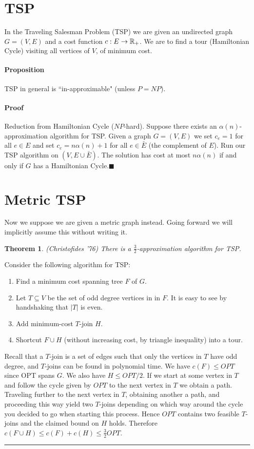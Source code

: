 \documentclass[letterpaper,12pt,oneside,onecolumn]{article}
\newenvironment{proof}{{\bf Proof:  }}{\hfill\rule{2mm}{2mm}}
\newtheorem{theorem}[fact]{Theorem}
\begin{document}
\section{TSP}
\paragraph{}
In the Traveling Salesman Problem (TSP) we are given an undirected graph $G = (V,E)$ and a cost function $c: E \rightarrow \mathbb{R}_+$. We are to find a tour (Hamiltonian Cycle) visiting all vertices of $V$, of minimum cost.
\paragraph{Proposition}
TSP in general is ``in-approximable" (unless $P=NP$).
\paragraph{Proof}
Reduction from Hamiltonian Cycle ($NP$-hard). Suppose there exists an $\alpha(n)$-approximation algorithm for TSP. Given a graph $G=(V,E)$ we set $c_e = 1$ for all $e\in E$ and set $c_e = n\alpha(n) + 1$ for all $e \in \bar{E}$ (the complement of $E$). Run our TSP algorithm on $(V,E\cup \bar{E})$. The solution has cost at most $n\alpha(n)$ if and only if $G$ has a Hamiltonian Cycle.$\blacksquare$
\section{Metric TSP}
Now we suppose we are given a metric graph instead. Going forward we will implicitly assume this without writing it.
\begin{theorem} (Christofides '76) There is a $\frac{3}{2}$-approximation algorithm for TSP.
\end{theorem}

\begin{proof}
Consider the following algorithm for TSP:
\begin{enumerate}
\item Find a minimum cost spanning tree $F$ of $G$.
\item Let $T\subseteq V$ be the set of odd degree vertices in in $F$. It is easy to see by handshaking that $|T|$ is even.
\item Add minimum-cost $T$-join $H$.
\item Shortcut $F\cup H$ (without increasing cost, by triangle inequality) into a tour.
\end{enumerate}
Recall that a $T$-join is a set of edges such that only the vertices in $T$ have odd degree, and $T$-joins can be found in polynomial time. We have $c(F) \leq OPT$ since OPT spans $G$. We also have $H \leq OPT/2$. If we start at some vertex in $T$ and follow the cycle given by $OPT$ to the next vertex in $T$ we obtain a path. Traveling further to the next vertex in $T$, obtaining another a path, and proceeding this way yield two $T$-joins depending on which way around the cycle you decided to go when starting this process. Hence $OPT$ contains two feasible $T$-joins and the claimed bound on $H$ holds. Therefore $c(F\cup H) \leq c(F) + c(H) \leq \frac{3}{2} OPT$.
\end{proof}
\end{document}
